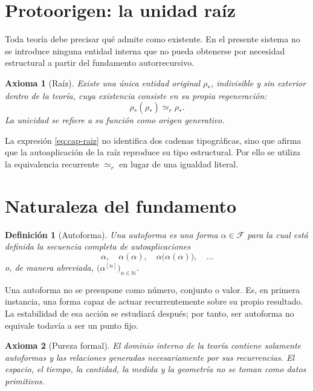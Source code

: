 \documentclass[11pt]{article}
\numberwithin{equation}{section}
\theoremstyle{prism}
\newtheorem{axiomacap}{Axioma}
\newtheorem{defcap}{Definición}
\newcommand{\F}{\mathcal{F}}
\newcommand{\N}{\mathbb{N}}
\newcommand{\raiz}{\rho_{\!*}}
\newcommand{\iter}[2]{#1^{[#2]}}
\newcommand{\peq}{\simeq_{\!r}}
\begin{document}
\renewcommand{\thesection}{I.\arabic{section}}
\renewcommand{\theHsection}{capI.\arabic{section}}
\renewcommand{\theHequation}{capI.\arabic{section}.\arabic{equation}}
\setcounter{section}{0}
\setcounter{axiomacap}{-1}
\setcounter{defcap}{0}

\section{Protoorigen: la unidad raíz}

Toda teoría debe precisar qué admite como existente. En el presente sistema no
se introduce ninguna entidad interna que no pueda obtenerse por necesidad
estructural a partir del fundamento autorrecursivo.

\begin{axiomacap}[Raíz]
Existe una única entidad original $\raiz$, indivisible y sin exterior dentro de
la teoría, cuya existencia consiste en su propia regeneración:
\begin{equation}
  \raiz(\raiz)\peq\raiz.
  \label{eq:cap-raiz}
\end{equation}
La unicidad se refiere a su función como origen generativo.
\end{axiomacap}

La expresión \eqref{eq:cap-raiz} no identifica dos cadenas tipográficas, sino
que afirma que la autoaplicación de la raíz reproduce su tipo estructural. Por
ello se utiliza la equivalencia recurrente $\peq$ en lugar de una igualdad
literal.

\section{Naturaleza del fundamento}

\begin{defcap}[Autoforma]
Una \emph{autoforma} es una forma $\alpha\in\F$ para la cual está definida la
secuencia completa de autoaplicaciones
\[
  \alpha,
  \quad \alpha(\alpha),
  \quad \alpha\bigl(\alpha(\alpha)\bigr),
  \quad\ldots
\]
o, de manera abreviada, $\bigl(\iter{\alpha}{n}\bigr)_{n\in\N}$.
\end{defcap}

Una autoforma no se presupone como número, conjunto o valor. Es, en primera
instancia, una forma capaz de actuar recurrentemente sobre su propio resultado.
La estabilidad de esa acción se estudiará después; por tanto, ser autoforma no
equivale todavía a ser un punto fijo.

\begin{axiomacap}[Pureza formal]
El dominio interno de la teoría contiene solamente autoformas y las relaciones
generadas necesariamente por sus recurrencias. El espacio, el tiempo, la
cantidad, la medida y la geometría no se toman como datos primitivos.
\end{axiomacap}
\end{document}
